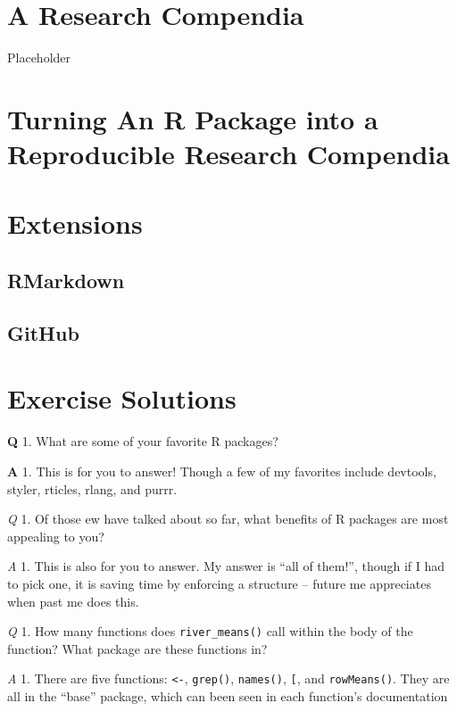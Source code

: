 \documentclass[
]{book}
\begin{document}
\hypertarget{a-research-compendia}{%
\chapter{A Research Compendia}\label{a-research-compendia}}

Placeholder

\hypertarget{your-compendia}{%
\chapter{Turning An R Package into a Reproducible Research Compendia}\label{your-compendia}}

\hypertarget{extensions}{%
\chapter{Extensions}\label{extensions}}

\hypertarget{rmarkdown}{%
\section{RMarkdown}\label{rmarkdown}}

\hypertarget{github}{%
\section{GitHub}\label{github}}

\hypertarget{exercise-solutions}{%
\chapter{Exercise Solutions}\label{exercise-solutions}}

\textbf{Q} 1. What are some of your favorite R packages?

\textbf{A} 1. This is for you to answer! Though a few of my favorites include devtools, styler, rticles, rlang, and purrr.

\emph{Q} 1. Of those ew have talked about so far, what benefits of R packages are most appealing to you?

\emph{A} 1. This is also for you to answer. My answer is ``all of them!'', though if I had to pick one, it is saving time by enforcing a structure -- future me appreciates when past me does this.

\emph{Q} 1. How many functions does \texttt{river\_means()} call within the body of the function? What package are these functions in?

\emph{A} 1. There are five functions: \texttt{\textless{}-}, \texttt{grep()}, \texttt{names()}, \texttt{{[}}, and \texttt{rowMeans()}. They are all in the ``base'' package, which can been seen in each function's documentation
\end{document}

